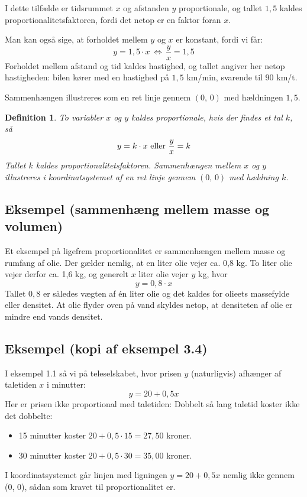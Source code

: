 \documentclass[12pt,oneside,a4paper]{article}
\newtheorem{mydef}[thm]{Definition}
\begin{document}
I dette tilfælde er tidsrummet $x$ og afstanden $y$ proportionale, og tallet
$1,5$ kaldes proportionalitetsfaktoren, fordi det netop er en faktor foran $x$.

Man kan også sige, at forholdet mellem $y$ og $x$ er konstant, fordi vi får:
$$
y = 1,5\cdot x \, \Leftrightarrow \, \frac{y}{x} = 1,5
$$
Forholdet mellem afstand og tid kaldes hastighed, og tallet angiver her netop
hastigheden: bilen kører med en hastighed på $1,5$ km/min, svarende til $90$
km/t.

Sammenhængen illustreres som en ret linje gennem $(0,\,0)$ med hældningen $1,5$.

\begin{mydef}
    To variabler $x$ og $y$ kaldes proportionale, hvis der findes et tal $k$, så
    $$
    y = k\cdot x \,\, {\rm eller} \,\, \frac{y}{x} = k
    $$
    Tallet $k$ kaldes proportionalitetsfaktoren. Sammenhængen mellem $x$ og $y$
    illustreres i koordinatsystemet af en ret linje gennem $(0,\,0)$ med 
    hældning $k$.
\end{mydef}

\subsection{Eksempel (sammenhæng mellem masse og volumen)}

Et eksempel på ligefrem proportionalitet er sammenhængen mellem masse og rumfang af olie.
Der gælder nemlig, at en liter olie vejer ca. 0,8 kg. To liter olie vejer derfor ca. 1,6 kg,
og generelt $x$ liter olie vejer $y$ kg, hvor
$$
y = 0,8 \cdot x
$$
Tallet $0,8$ er således vægten af én liter olie og det kaldes for olieets massefylde eller densitet.
At olie flyder oven på vand skyldes netop, at densiteten af olie er mindre end vands densitet.

\subsection{Eksempel (kopi af eksempel 3.4)}
I eksempel 1.1 så vi på teleselskabet, hvor prisen $y$ (naturligvis) afhænger af
taletiden $x$ i minutter:
$$
y=20+0,5x
$$
Her er prisen ikke proportional med taletiden: Dobbelt så lang taletid koster ikke
det dobbelte:
\begin{itemize}
    \item 15 minutter koster $20+0,5\cdot 15 = 27,50$ kroner.
    \item 30 minutter koster $20+0,5\cdot 30 = 35,00$ kroner.
\end{itemize}
I koordinatsystemet går linjen med ligningen $y=20+0,5x$ nemlig ikke gennem (0, 0),
sådan som kravet til proportionalitet er.
\end{document}
